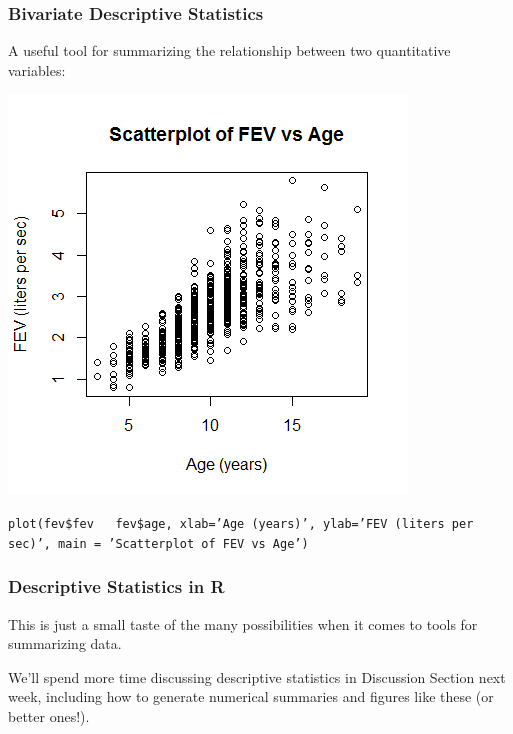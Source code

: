 \documentclass[12pt, 
hyperref={colorlinks=true, linkcolor=blue, urlcolor=cyan}]{beamer}
\begin{document}
\begin{frame}
\frametitle{Bivariate Descriptive Statistics}

A useful tool for summarizing the relationship between two quantitative variables:

\vspace{-0.4cm} \center \includegraphics[height=0.6\textheight]{./scatterplot-fev-age}

\begin{scriptsize} \texttt{plot(fev\$fev ~ fev\$age, xlab='Age (years)', ylab='FEV (liters per sec)', main = 'Scatterplot of FEV vs Age')
} \end{scriptsize}

\end{frame}

\begin{frame}
\frametitle{Descriptive Statistics in R}

This is just a small taste of the many possibilities when it comes to tools for summarizing data.

We'll spend more time discussing descriptive statistics in Discussion Section next week, including how to generate numerical summaries and figures like these (or better ones!). 
\end{frame}
\end{document}

